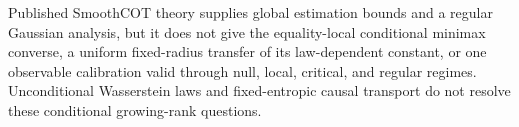 Published SmoothCOT theory supplies global estimation bounds and a regular Gaussian analysis, but it does not give the equality-local conditional minimax converse, a uniform fixed-radius transfer of its law-dependent constant, or one observable calibration valid through null, local, critical, and regular regimes. Unconditional Wasserstein laws and fixed-entropic causal transport do not resolve these conditional growing-rank questions.